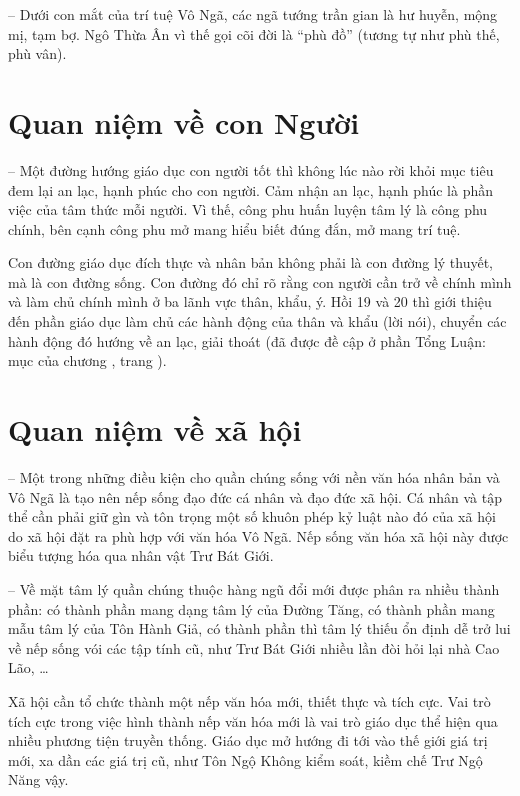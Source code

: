 -- Dưới con mắt của trí tuệ Vô Ngã, các ngã tướng trần gian là hư huyễn, mộng mị, tạm bợ. Ngô Thừa Ân vì thế gọi cõi đời là ``phù đồ'' (tương tự như phù thế, phù vân).

\section{Quan niệm về con Người} %
\label{sec:18_19_con_nguoi}

-- Một đường hướng giáo dục con người tốt thì không lúc nào rời khỏi mục tiêu đem lại an lạc, hạnh phúc cho con người. Cảm nhận an lạc, hạnh phúc là phần việc của tâm thức mỗi người. Vì thế, công phu huấn luyện tâm lý là công phu chính, bên cạnh công phu mở mang hiểu biết đúng đắn, mở mang trí tuệ.

Con đường giáo dục đích thực và nhân bản không phải là con đường lý thuyết, mà là con đường sống. Con đường đó chỉ rõ rằng con người cần trở về chính mình và làm chủ chính mình ở ba lãnh vực thân, khẩu, ý. Hồi 19 và 20 thì giới thiệu đến phần giáo dục làm chủ các hành động của thân và khẩu (lời nói), chuyển các hành động đó hướng về an lạc, giải thoát (đã được đề cập ở phần Tổng Luận: mục  của chương , trang \pageref{sec:qua_cac_nhan_vat_chinh}).

\section{Quan niệm về xã hội} %
\label{sec:18_19_xa_hoi}

-- Một trong những điều kiện cho quần chúng sống với nền văn hóa nhân bản và Vô Ngã là tạo nên nếp sống đạo đức cá nhân và đạo đức xã hội. Cá nhân và tập thể cần phải giữ gìn và tôn trọng một số khuôn phép kỷ luật nào đó của xã hội do xã hội đặt ra phù hợp với văn hóa Vô Ngã. Nếp sống văn hóa xã hội này được biểu tượng hóa qua nhân vật Trư Bát Giới.

-- Về mặt tâm lý quần chúng thuộc hàng ngũ đổi mới được phân ra nhiều thành phần: có thành phần mang dạng tâm lý của Đường Tăng, có thành phần mang mẫu tâm lý của Tôn Hành Giả, có thành phần thì tâm lý thiếu ổn định dễ trở lui về nếp sống vói các tập tính cũ, như Trư Bát Giới nhiều lần đòi hỏi lại nhà Cao Lão, \ldots

Xã hội cần tổ chức thành một nếp văn hóa mới, thiết thực và tích cực. Vai trò tích cực trong việc hình thành nếp văn hóa mới là vai trò giáo dục thể hiện qua nhiều phương tiện truyền thống. Giáo dục mở hướng đi tới vào thế giới giá trị mới, xa dần các giá trị cũ, như Tôn Ngộ Không kiểm soát, kiềm chế Trư Ngộ Năng vậy.
